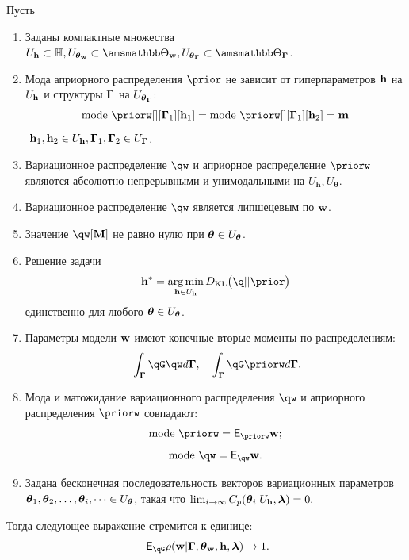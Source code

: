 \begin{theorem}
Пусть
\begin{enumerate}
\item Заданы компактные множества $\Uh \subset \Hb, \Utetaw \subset \Tetawb, \UtetaG \subset \TetaGb$.


\item Мода априорного распределения $\prior$ не зависит от гиперпараметров $\mathbf{h}$  на $U_{\mathbf{h}}$ и структуры $\boldsymbol{\Gamma}$ на $U_{\boldsymbol{\theta}_{\boldsymbol{\Gamma}}}$:
\[
\text{mode}~\priorw[][\G_1][\h_1]=\text{mode}~\priorw[][\G_1][\h_2]=\mathbf{m}
\]
$~\mathbf{h}_1,\mathbf{h}_2 \in U_{\mathbf{h}}, \boldsymbol{\Gamma}_1,\boldsymbol{\Gamma}_2 \in U_{\boldsymbol{\Gamma}}$.

\item Вариационное распределение $\qw$ и априорное распределение $\priorw$  являются абсолютно непрерывными и унимодальными на  $U_\mathbf{h}, U_{\boldsymbol{\theta}}$.

\item Вариационное распределение $\qw$ является липшецевым по $\mathbf{w}$.

\item Значение $\qw[\mathbf{M}]$ не равно нулю при $\boldsymbol{\theta} \in U_{\boldsymbol{\theta}}$.

\item Решение задачи 
\begin{equation}
\label{eq:dkl_solve}
\h^{*} = \argmin_{\h \in \Uh} \KL{\q}{\prior}
\end{equation} единственно для любого $\boldsymbol{\theta} \in U_{\boldsymbol{\theta}}$.
\item Параметры модели $\mathbf{w}$ имеют конечные вторые моменты по распределениям:
\[
   \int_{\G}\qG\qw d\G, \quad \int_{\G}\qG\priorw d\G.
\]

\item Мода и матожидание вариационного распределения $\qw$ и априорного распределения $\priorw$  совпадают:
\[
    \text{mode}~\priorw= \E_{\priorw} \w;
\]
\[
  \text{mode}~\qw = \E_{\qw} \w.
\]

\item Задана  бесконечная последовательность векторов вариационных параметров $\boldsymbol{\theta}_1,\boldsymbol{\theta}_2,\dots,\boldsymbol{\theta}_i,\dots \in U_{\boldsymbol{\theta}}$, такая что $\lim_{i \to \infty}C_p(\boldsymbol{\theta}_i|U_{\mathbf{h}},\boldsymbol{\lambda}) = 0.$

\end{enumerate}
Тогда следующее выражение стремится к единице:
\[
   \E_{\qG} {\rho}(\w|\G, \tetaw, \h, \lam) \to 1.
\]


\end{theorem}

